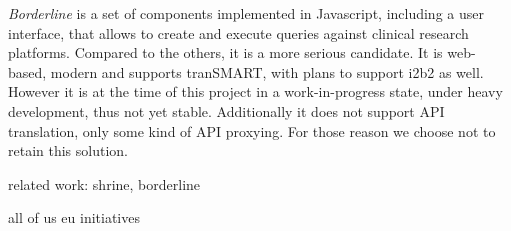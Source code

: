\emph{Borderline} is a set of components implemented in Javascript, including a user interface, that allows to create and execute queries against clinical research platforms.
Compared to the others, it is a more serious candidate. It is web-based, modern and supports tranSMART, with plans to support i2b2 as well.
However it is at the time of this project in a work-in-progress state, under heavy development, thus not yet stable.
Additionally it does not support API translation, only some kind of API proxying.
For those reason we choose not to retain this solution.


related work: shrine, borderline

all of us
eu initiatives
